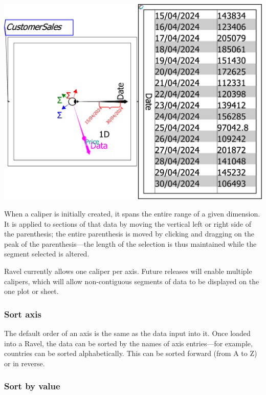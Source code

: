 \noindent\includegraphics[width=\textwidth]{images/SmallBusinessCalipers}

When a caliper is initially created, it spans the entire range of
a given dimension. It is applied to sections of that data by moving
the vertical left or right side of the parenthesis; the entire parenthesis
is moved by clicking and dragging on the peak of the parenthesis---the
length of the selection is thus maintained while the segment selected
is altered.

Ravel currently allows one caliper per axis. Future releases will
enable multiple calipers, which will allow non-contiguous segments
of data to be displayed on the one plot or sheet.

\subsubsection{Sort axis}

The default order of an axis is the same as the data input into it.
Once loaded into a Ravel, the data can be sorted by the names of axis
entries---for example, countries can be sorted alphabetically. This
can be sorted forward (from A to Z) or in reverse.

\subsubsection{Sort by value}

